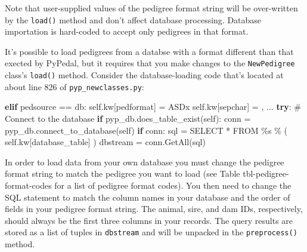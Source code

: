 \documentclass[
  letterpaper,
  DIV=11,
  numbers=noendperiod]{scrreprt}
\newenvironment{Shaded}{\begin{snugshade}}{\end{snugshade}}
\newcommand{\CommentTok}[1]{\textcolor[rgb]{0.37,0.37,0.37}{#1}}
\newcommand{\ControlFlowTok}[1]{\textcolor[rgb]{0.00,0.23,0.31}{\textbf{#1}}}
\newcommand{\NormalTok}[1]{\textcolor[rgb]{0.00,0.23,0.31}{#1}}
\newcommand{\OperatorTok}[1]{\textcolor[rgb]{0.37,0.37,0.37}{#1}}
\newcommand{\SpecialCharTok}[1]{\textcolor[rgb]{0.37,0.37,0.37}{#1}}
\newcommand{\StringTok}[1]{\textcolor[rgb]{0.13,0.47,0.30}{#1}}
\newcommand{\VariableTok}[1]{\textcolor[rgb]{0.07,0.07,0.07}{#1}}
\begin{document}
Note that user-supplied values of the pedigree format string will be
over-written by the \texttt{load()} method and don't affect database
processing. Database importation is hard-coded to accept only pedigrees
in that format.

It's possible to load pedigrees from a databse with a format different
than that exected by PyPedal, but it requires that you make changes to
the \texttt{NewPedigree} class's \texttt{load()} method. Consider the
database-loading code that's located at about line 826 of
\texttt{pyp\_newclasses.py}:

\begin{Shaded}
\begin{Highlighting}[]
\ControlFlowTok{elif}\NormalTok{ pedsource }\OperatorTok{==} \StringTok{\textquotesingle{}db\textquotesingle{}}\NormalTok{:}
    \VariableTok{self}\NormalTok{.kw[}\StringTok{\textquotesingle{}pedformat\textquotesingle{}}\NormalTok{] }\OperatorTok{=} \StringTok{\textquotesingle{}ASDx\textquotesingle{}}
    \VariableTok{self}\NormalTok{.kw[}\StringTok{\textquotesingle{}sepchar\textquotesingle{}}\NormalTok{] }\OperatorTok{=} \StringTok{\textquotesingle{},\textquotesingle{}}
\NormalTok{...}
    \ControlFlowTok{try}\NormalTok{:}
        \CommentTok{\# Connect to the database}
        \ControlFlowTok{if}\NormalTok{ pyp\_db.does\_table\_exist(}\VariableTok{self}\NormalTok{):}
\NormalTok{          conn }\OperatorTok{=}\NormalTok{ pyp\_db.connect\_to\_database(}\VariableTok{self}\NormalTok{)}
            \ControlFlowTok{if}\NormalTok{ conn:}
\NormalTok{                sql }\OperatorTok{=} \StringTok{\textquotesingle{}SELECT * FROM }\SpecialCharTok{\%s}\StringTok{\textquotesingle{}} \OperatorTok{\%}\NormalTok{ ( }\VariableTok{self}\NormalTok{.kw[}\StringTok{\textquotesingle{}database\_table\textquotesingle{}}\NormalTok{] )}
\NormalTok{                dbstream }\OperatorTok{=}\NormalTok{ conn.GetAll(sql)}
\end{Highlighting}
\end{Shaded}

In order to load data from your own database you must change the
pedigree format string to match the pedigree you want to load (see Table
tbl-pedigree-format-codes for a list of pedigree format codes). You then
need to change the SQL statement to match the column names in your
database and the order of fields in your pedigree format string. The
animal, sire, and dam IDs, respectively, should always be the first
three columns in your records. The query results are stored as a list of
tuples in \texttt{dbstream} and will be unpacked in the
\texttt{preprocess()} method.
\end{document}

